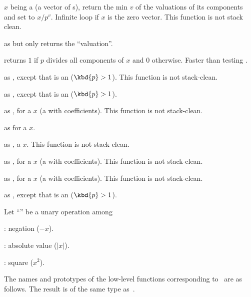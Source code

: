  $x$ being a  (a vector
of s), return the min $v$ of the valuations of its components and
set  to $x/p^v$. Infinite loop if $x$ is the zero vector.
This function is not stack clean.

 as  but only returns the
``valuation''.

 returns $1$ if $p$ divides all components
of $x$ and $0$ otherwise. Faster than testing .

 as ,
except that  is an  ($\kbd{p} > 1$).
This function is not stack-clean.

 as ,
except that  is an  ($\kbd{p} > 1$).


 as , for
a  $x$ (a  with  coefficients).
This function is not stack-clean.

 as  for a  $x$.

 as ,
a  $x$.
This function is not stack-clean.

 as , for
a  $x$ (a  with  coefficients).
This function is not stack-clean.

 as , for
a  $x$ (a  with  coefficients).
This function is not stack-clean.

 as ,
except that  is an  ($\kbd{p} > 1$).

 Let ``\op'' be a unary operation among

\item {}: negation ($-x$).

\item {}: absolute value ($|x|$).

\item {}: square ($x^2$).

\noindent The names and prototypes of the low-level functions corresponding
to \op\ are as follows. The result is of the same type as~.

